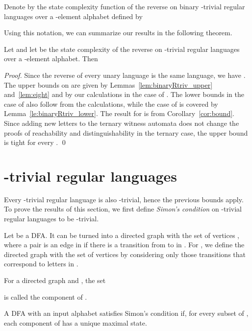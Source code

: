 \documentclass[runningheads]{llncs}
\newcommand{\R}{}
\newcommand{\J}{}
\begin{document}
  Denote by  the state complexity function of the reverse
  on binary \R-trivial regular languages over a -element alphabet defined by
  
  Using this notation, 
  we can summarize our results
  in the following theorem.

  \begin{theorem}\label{thm1}
    Let  and let  be the state complexity of
    the reverse
    on \R-trivial regular languages over a -element alphabet.
    Then
    
  \end{theorem}  
  \begin{proof}
    Since the reverse of every unary language is the same language,
    we have .
    The upper bounds on  are given by Lemmas~\ref{lem:binaryRtriv_upper} and~\ref{lem:eight} and by 
    our calculations in the case of .
    The lower bounds in the case of 
    also follow from the calculations,
    while the case of  is covered by Lemma~\ref{le:binaryRtriv_lower}.
    The result for  is from Corollary~\ref{cor:bound}.
    Since adding  new letters to the ternary witness automata does not change
    the proofs  of reachability and distinguishability
    in the ternary case,
    the upper bound is tight for every .
  \qed
  \end{proof}


\section{\J-trivial regular languages}\label{***Jtriv}
  Every \J-trivial regular language is also \R-trivial, hence the previous bounds apply. To prove the results of this section, we first define {\em Simon's condition\/} on \R-trivial regular languages to be \J-trivial. 
  
  Let  be a DFA. It can be turned into a directed graph  with the set of vertices , where a pair  is an edge in  if there is a transition from  to  in . For , we define the directed graph  with the set of vertices  by considering only those transitions that correspond to letters in .
  
  For a directed graph  and , the set 
  
  is called the component of .

  \begin{definition}
    A DFA  with an input alphabet 
    satisfies Simon's condition
    if, for every subset  of , each component of  has a unique maximal state.
  \end{definition}
\end{document}
